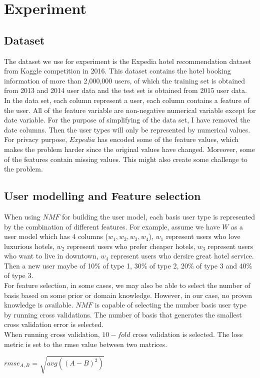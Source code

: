 \documentclass[11pt]{article} %
\begin{document}
\section{Experiment}
\subsection{Dataset}
The dataset we use for experiment is the Expedia hotel recommendation dataset from Kaggle competition in 2016. This dataset contains the hotel booking information of more than 2,000,000 users, of which the training set is obtained from 2013 and 2014 user data and the test set is obtained from 2015 user data.\\
In the data set, each column represent a user, each column contains a feature of the user. All of the feature variable are non-negative numerical variable except for date variable. For the purpose of simplifying of the data set, I have removed the date columns. Then the user types will only be represented by numerical values.\\
For privacy purpose, $Expedia$ has encoded some of the feature values, which makes the problem harder since the original values have changed. Moreover, some of the features contain missing values. This might also create some challenge to the problem.
\subsection{User modelling and Feature selection}
When using $NMF$ for building the user model, each basis user type is represented by the combination of different features. For example, assume we have $W$ as a user model which has 4 columns ($w_{1}, w_{2}, w_{3}, w_{4}$), $w_{1}$ represent users who love luxurious hotels, $w_{2}$ represent users who prefer cheaper hotels, $w_{3}$ represent users who want to live in downtown, $w_{4}$ represent users who dersire great hotel service. Then a new user maybe of 10\% of type 1, 30\% of type 2, 20\% of type 3 and 40\% of type 3.\\    
For feature selection, in some cases, we may also be able to select the number of basis based on some prior or domain knowledge. However, in our case, no proven knowledge is available. $NMF$ is capable of selecting the number basis user type by running cross validations. The number of basis that generates the smallest cross validation error is selected.\\
When running cross validation, $10-fold$ cross validation is selected. The loss metric is set to the rmse value between two matrices.\\
\centerline{$rmse_{A,B}$ = $\sqrt{avg((A-B)^{2})}$}
\end{document}
